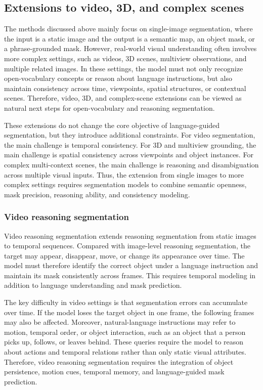 \subsection{Extensions to video, 3D, and complex scenes}
\label{subsec:extensions}

The methods discussed above mainly focus on single-image segmentation, where the input is a static image and the output is a semantic map, an object mask, or a phrase-grounded mask. 
However, real-world visual understanding often involves more complex settings, such as videos, 3D scenes, multiview observations, and multiple related images. 
In these settings, the model must not only recognize open-vocabulary concepts or reason about language instructions, but also maintain consistency across time, viewpoints, spatial structures, or contextual scenes. 
Therefore, video, 3D, and complex-scene extensions can be viewed as natural next steps for open-vocabulary and reasoning segmentation.

These extensions do not change the core objective of language-guided segmentation, but they introduce additional constraints. 
For video segmentation, the main challenge is temporal consistency. 
For 3D and multiview grounding, the main challenge is spatial consistency across viewpoints and object instances. 
For complex multi-context scenes, the main challenge is reasoning and disambiguation across multiple visual inputs. 
Thus, the extension from single images to more complex settings requires segmentation models to combine semantic openness, mask precision, reasoning ability, and consistency modeling.

\subsubsection{Video reasoning segmentation}

Video reasoning segmentation extends reasoning segmentation from static images to temporal sequences. 
Compared with image-level reasoning segmentation, the target may appear, disappear, move, or change its appearance over time. 
The model must therefore identify the correct object under a language instruction and maintain its mask consistently across frames. 
This requires temporal modeling in addition to language understanding and mask prediction.

The key difficulty in video settings is that segmentation errors can accumulate over time. 
If the model loses the target object in one frame, the following frames may also be affected. 
Moreover, natural-language instructions may refer to motion, temporal order, or object interaction, such as an object that a person picks up, follows, or leaves behind. 
These queries require the model to reason about actions and temporal relations rather than only static visual attributes. 
Therefore, video reasoning segmentation requires the integration of object persistence, motion cues, temporal memory, and language-guided mask prediction.

